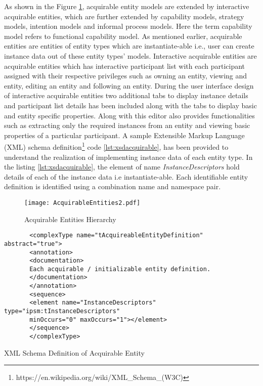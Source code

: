 As shown in the Figure \ref{fig:acquirableentities2}, acquirable entity models are extended by interactive acquirable entities, which are further extended by capability models, strategy models, intention models and informal process models. Here the term capability model refers to functional capability model. As mentioned earlier, acquirable entities are entities of entity types which are instantiate-able i.e., user can create instance data out of these entity types' models. Interactive acquirable entities are acquirable entities which has interactive participant list with each participant assigned with their respective privileges such as owning an entity, viewing and entity, editing an entity and following an entity. During the user interface design of interactive acquirable entities two additional tabs to display instance details and participant list details has been included along with the tabs to display basic and entity specific properties. Along with this editor also provides functionalities such as extracting only the required instances from an entity and viewing basic properties of a particular participant. A sample Extensible Markup Language (XML) schema definition\footnote{https://en.wikipedia.org/wiki/XML\_Schema\_(W3C)} code \ref{lst:xsdacquirable}, has been provided to understand the realization of implementing instance data of each entity type. In the listing \ref{lst:xsdacquirable}, the element of name \textit{InstanceDescriptors} hold details of each of the instance data i.e instantiate-able. Each identifiable entity definition is identified
using a combination name and namespace pair. 

\begin{figure}
	\centering
	\texttt{[image: AcquirableEntities2.pdf]}
	\caption{Acquirable Entities Hierarchy}
	\label{fig:acquirableentities2}
\end{figure}

\begin{Listing}
	\begin{lstlisting}
	   <complexType name="tAcquireableEntityDefinition" abstract="true">
	   <annotation>
	   <documentation>
	   Each acquirable / initializable entity definition.
	   </documentation>
	   </annotation>
	   <sequence>
	   <element name="InstanceDescriptors" type="ipsm:tInstanceDescriptors"
	   minOccurs="0" maxOccurs="1"></element>
	   </sequence>
	   </complexType>
		\end{lstlisting}
		\caption{XML Schema Definition of Acquirable Entity}
		\label{lst:xsdacquirable}
\end{Listing}

